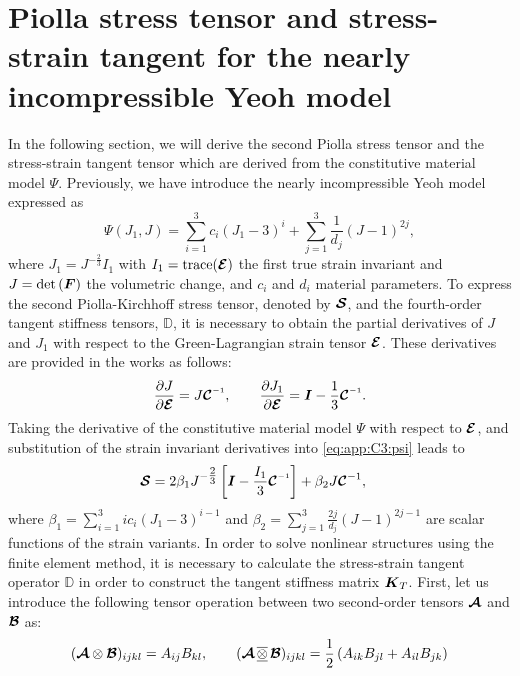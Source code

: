 \section{Piolla stress tensor and stress-strain tangent for the nearly incompressible Yeoh model} \label{app:C3:yeohmodel}
In the following section, we will derive the second Piolla stress tensor and the stress-strain tangent tensor which are derived from the constitutive material model $\Psi$. Previously, we have introduce the nearly incompressible Yeoh model expressed as
%
\begin{equation}
\Psi(J_1,J) = \sum_{i = 1}^{3} c_i (J_1 - 3)^i + \sum_{j = 1}^{3} \frac{1}{d_j} (J - 1)^{2j},
\label{eq:app:C3:psi}
\end{equation}
%
where $J_1 = J^{-\tfrac{2}{3}} I_1$ with $I_1 = \text{trace}({\boldsymbol{\mathcal{E}}})$ the first true strain invariant and $J = \textnormal{det}\left( {{\boldsymbol{F}}} \right)$ the volumetric change, and $c_i$ and $d_i$ material parameters. To express the second Piolla-Kirchhoff stress tensor, denoted by $\boldsymbol{\mathcal{S}}$, and the fourth-order tangent stiffness tensors, $\mathbb{D}$, it is necessary to obtain the partial derivatives of $J$ and $J_1$ with respect to the Green-Lagrangian strain tensor $\boldsymbol{\mathcal{E}}$.  These derivatives are provided in the works \cite{Kim2018,Renaud2011} as follows: 
%
\begin{equation}
\frac{\p J}{\p \ten{E}} = J \ten{C}\inv, \quad \quad
\frac{\p J_1}{\p \ten{E}} = \IB - \frac{1}{3} \ten{C}\inv.
\end{equation}
%
Taking the derivative of the constitutive material model $\Psi$ with respect to $\boldsymbol{\mathcal{E}}$, and substitution of the strain invariant derivatives into \eqref{eq:app:C3:psi} leads to 
%
\begin{align}
\ten{S} = 2\beta_{1} J^{-\tfrac{2}{3}}\left[\IB - \frac{I_1}{3}\CT\inv \right] & + \beta_2 J \ten{C}^{-1},
\label{eq:app:C3:secondPiollastress}
\end{align}
%
where $\beta_1 = \sum_{i=1}^3 i {c_i} (J_1 - 3)^{i-1} $ and $\beta_2 = \sum_{j=1}^3 \frac{2j}{d_j} \left(J - 1\right)^{2j - 1}$ are scalar functions of the strain variants. In order to solve nonlinear structures using the finite element method, it is necessary to calculate the stress-strain tangent operator $\mathbb{D}$ in order to construct the tangent stiffness matrix ${\boldsymbol{K}}_T$. First, let us introduce the following tensor operation between two second-order tensors ${\boldsymbol{\mathcal{A}}}$ and ${\boldsymbol{\mathcal{B}}}$ as: 
%
\begin{equation}
({\boldsymbol{\mathcal{A}}} \otimes {\boldsymbol{\mathcal{B}}})_{ijkl} = A_{ij} B_{kl}, \quad \quad ({\boldsymbol{\mathcal{A}}} \,\overline{\underline{\otimes}}\, {\boldsymbol{\mathcal{B}}})_{ijkl} = \frac{1}{2}\left(A_{ik} B_{jl} + A_{il}B_{jk} \right)
\end{equation}
